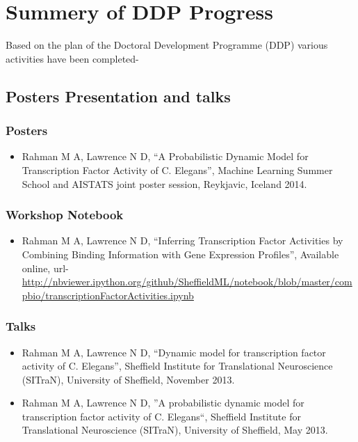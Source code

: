 
\chapter{Summery of DDP Progress} %

\label{AppendixB} %


Based on the plan of the Doctoral Development Programme (DDP) various activities have been completed-

\section{Posters Presentation and talks}
\subsection{Posters}
\begin{itemize}
 \item Rahman M A,  Lawrence N D, ``A Probabilistic Dynamic Model for Transcription Factor Activity of C. Elegans'', Machine Learning Summer School and AISTATS joint poster session, Reykjavic, Iceland 2014.
\end{itemize}
\subsection{Workshop Notebook}
\begin{itemize}
 \item Rahman M A,  Lawrence N D, ``Inferring Transcription Factor Activities by Combining Binding Information with Gene Expression Profiles'', Available online, url-
 \url{http://nbviewer.ipython.org/github/SheffieldML/notebook/blob/master/compbio/transcriptionFactorActivities.ipynb}
\end{itemize}
\subsection{Talks}
\begin{itemize}
 \item Rahman M A, Lawrence N D, ``Dynamic model for transcription factor activity of C. Elegans'', Sheffield Institute for Translational Neuroscience (SITraN), University of Sheffield, November 2013.
 \item Rahman M A, Lawrence N D, ''A probabilistic dynamic model for transcription factor activity of C. Elegans``, Sheffield Institute for Translational Neuroscience (SITraN), University of Sheffield, May 2013.
\end{itemize}


